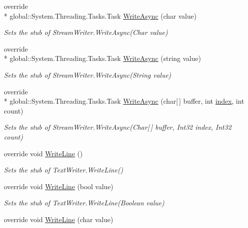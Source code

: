 \begin{DoxyCompactItemize}
override \\*
global\-::\-System.\-Threading.\-Tasks.\-Task \hyperlink{class_system_1_1_i_o_1_1_fakes_1_1_stub_stream_writer_ad7724c3be3f37b9361f96a2fee4e4f3f}{Write\-Async} (char value)
\begin{DoxyCompactList}\small\item\em Sets the stub of Stream\-Writer.\-Write\-Async(\-Char value)\end{DoxyCompactList}\item 
override \\*
global\-::\-System.\-Threading.\-Tasks.\-Task \hyperlink{class_system_1_1_i_o_1_1_fakes_1_1_stub_stream_writer_aa7f6f896686856c8e7f4c26d2f9afd96}{Write\-Async} (string value)
\begin{DoxyCompactList}\small\item\em Sets the stub of Stream\-Writer.\-Write\-Async(\-String value)\end{DoxyCompactList}\item 
override \\*
global\-::\-System.\-Threading.\-Tasks.\-Task \hyperlink{class_system_1_1_i_o_1_1_fakes_1_1_stub_stream_writer_a992c1719c4e3f0491b5b3ef05a2cd4c1}{Write\-Async} (char\mbox{[}$\,$\mbox{]} buffer, int \hyperlink{jquery-1_810_82-vsdoc_8js_a75bb12d1f23302a9eea93a6d89d0193e}{index}, int count)
\begin{DoxyCompactList}\small\item\em Sets the stub of Stream\-Writer.\-Write\-Async(\-Char\mbox{[}$\,$\mbox{]} buffer, Int32 index, Int32 count)\end{DoxyCompactList}\item 
override void \hyperlink{class_system_1_1_i_o_1_1_fakes_1_1_stub_stream_writer_a6ab32c555b828c34c95dffa9cbb82990}{Write\-Line} ()
\begin{DoxyCompactList}\small\item\em Sets the stub of Text\-Writer.\-Write\-Line()\end{DoxyCompactList}\item 
override void \hyperlink{class_system_1_1_i_o_1_1_fakes_1_1_stub_stream_writer_a994404e2ed4bb5034ac9d890b2d397c2}{Write\-Line} (bool value)
\begin{DoxyCompactList}\small\item\em Sets the stub of Text\-Writer.\-Write\-Line(\-Boolean value)\end{DoxyCompactList}\item 
override void \hyperlink{class_system_1_1_i_o_1_1_fakes_1_1_stub_stream_writer_acd387a598ee873742b0bd70bfbc32212}{Write\-Line} (char value)

\end{DoxyCompactItemize}
